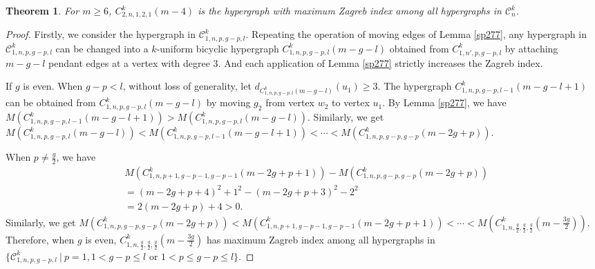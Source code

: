 \documentclass[preprint,12pt]{elsarticle1}
\newtheorem{thm}{Theorem}[section]
\numberwithin{equation}{section}
\begin{document}
\begin{spacing}{1.15}
\begin{thm}
For $m\geq 6$, $C_{2,n,1,2,1}^{k}(m-4)$ is the hypergraph with maximum Zagreb index among all hypergraphs in $\mathcal{C}_{n}^{k}$.
\end{thm}
\begin{proof}
Firstly, we consider the hypergraph in $\mathcal{C}_{1,n,p,g-p,l}^{k}$.
Repeating the operation of moving edges of Lemma \ref{sp277}, any hypergraph in $\mathcal{C}_{1,n,p,g-p,l}^{k}$ can be changed into a $k$-uniform bicyclic hypergraph $C_{1,n,p,g-p,l}^{k}(m-g-l)$
obtained from $C_{1,n',p,g-p,l}^{k}$ by attaching $m-g-l$ pendant edges at a vertex with degree 3.
And each application of Lemma \ref{sp277} strictly increases the Zagreb index.

If $g$ is even. When $g-p<l$, without loss of generality, let $d_{C_{1,n,p,g-p,l}^{k}(m-g-l)}(u_{1})\geq3$.
The hypergraph
$C_{1,n,p,g-p,l-1}^{k}(m-g-l+1)$ can
be obtained from $C_{1,n,p,g-p,l}^{k}(m-g-l)$ by moving $g_{2}$
from vertex $w_{2}$ to vertex $u_{1}$. By Lemma \ref{sp277}, we have $M(C_{1,n,p,g-p,l-1}^{k}(m-g-l+1))>M(C_{1,n,p,g-p,l}^{k}(m-g-l))$.
Similarly, we get $M(C_{1,n,p,g-p,l}^{k}(m-g-l))<M(C_{1,n,p,g-p,l-1}^{k}(m-g-l+1))<\cdots<M(C_{1,n,p,g-p,g-p}^{k}(m-2g+p)).$

When $p\neq \frac{g}{2}$, we have
\begin{align*}
  &M(C_{1,n,p+1,g-p-1,g-p-1}^{k}(m-2g+p+1))-M(C_{1,n,p,g-p,g-p}^{k}(m-2g+p))\\
  &=(m-2g+p+4)^{2}+1^{2}-(m-2g+p+3)^{2}-2^{2}\\
   &=2(m-2g+p)+4>0.
\end{align*}
Similarly, we get $M(C_{1,n,p,g-p,g-p}^{k}(m-2g+p))<M(C_{1,n,p+1,g-p-1,g-p-1}^{k}(m-2g+p+1))<\cdots<M(C_{1,n,\frac{g}{2},\frac{g}{2},\frac{g}{2}}^{k}(m-\frac{3g}{2}))$. Therefore, when $g$ is even, $C_{1,n,\frac{g}{2},\frac{g}{2},\frac{g}{2}}^{k}(m-\frac{3g}{2})$ has maximum Zagreb index among all hypergraphs in $\{\mathcal{C}_{1,n,p,g-p,l}^{k}~|~ p=1,1<g-p\leq l \text{~or~} 1<p\leq g-p\leq l\}$.


\end{proof}
\end{spacing}
\end{document}
